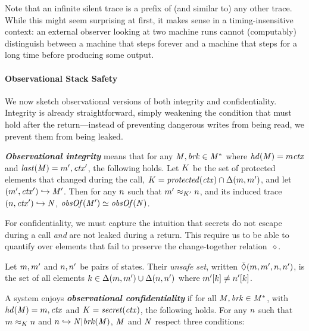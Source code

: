 \documentclass[10pt,conference]{ieeetran}%
\theoremstyle{definition}
\begin{document}
{
Note that an infinite silent trace is a
prefix of (and similar to) any other trace. While this might seem
surprising at first, it makes sense in a timing-insensitive context:
an external observer looking at two machine runs cannot (computably)
distinguish between a machine that steps forever and a machine that
steps for a long time before producing some output.

\paragraph*{Observational Stack Safety}

We now sketch observational versions of both integrity and confidentiality.
Integrity is already straightforward, simply weakening the condition that must hold
after the return---instead of preventing dangerous writes from being read, we
prevent them from being leaked.

\textbf{\em Observational integrity} means that for any \(\mathit{M},\mathit{brk} \in \mathit{M}^*\)
where \(\mathit{hd}(\mathit{M}) = m\mathit{ctx}\) and \(\mathit{last}(\mathit{M}) = m',\mathit{ctx}'\),
the following holds. Let \(K\) be the set of protected elements that changed during
the call, \(K = \mathit{protected}(\mathit{ctx}) \cap \Delta(m, m')\),
and let \((m',\mathit{ctx}') \hookrightarrow \mathit{M}'\).
Then for any \(n\) such that
\(m' \approx_{K'} n\), and its induced trace
\((n,\mathit{ctx}') \hookrightarrow \mathit{N}\), \(\mathit{obsOf}(\mathit{M}') \simeq \mathit{obsOf}(\mathit{N})\).

\medskip

For confidentiality, we must capture the intuition that
secrets do not escape during a call {\em and} are not leaked during a return.
This require us to be able to quantify over elements that fail to preserve
the change-together relation~\(\diamond\).

 Let \(m,m'\) and \(n,n'\)
be pairs of states. Their {\em unsafe set}, written
\(\bar{\Diamond}(m,m',n,n')\), is the set of all elements
\(k \in \Delta(m,m') \cup \Delta(n,n')\) where
\(m'[k] \not = n'[k]\).

A system enjoys \textbf{\em observational confidentiality} if for all
\(\mathit{M},\mathit{brk} \in \mathit{M}^*\), with \(\mathit{hd}(\mathit{M}) = m,\mathit{ctx}\) and
\(K = \mathit{secret}(\mathit{ctx})\), the following holds.
%
For any \(n\) such that \(m \approx_K n\) and
\(n \hookrightarrow \mathit{N} | \mathit{brk}(\mathit{M})\),
\(\mathit{M}\) and \(\mathit{N}\) respect three conditions:

}
\end{document}
